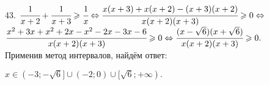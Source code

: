 43. $\cfrac{1}{x+2}+\cfrac{1}{x+3}\geqslant\cfrac{1}{x}\Leftrightarrow \cfrac{x(x+3)+x(x+2)-(x+3)(x+2)}{x(x+2)(x+3)}\geqslant0\Leftrightarrow$\\$
\cfrac{x^2+3x+x^2+2x-x^2-2x-3x-6}{x(x+2)(x+3)}\geqslant0\Leftrightarrow\cfrac{(x-\sqrt{6})(x+\sqrt{6})}{x(x+2)(x+3)}\geqslant0.$\\ Применив метод интервалов, найдём ответ:
\begin{figure}[ht!]
\end{figure}
$x\in(-3;-\sqrt{6}]\cup(-2;0)\cup[\sqrt{6};+\infty).$\\
